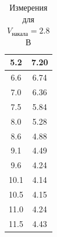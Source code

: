\documentclass[12pt]{article}
\begin{document}
\begin{table}[h!]
{\begin{tabular}{|c|c|}
\hline
5.2	&7.20 \\
\hline
6.6	&6.74 \\
\hline
7.0&	6.36 \\
\hline
7.5	&5.84 \\
\hline
8.0	&5.28 \\
\hline
8.6&	4.88 \\
\hline
9.1&	4.49 \\
\hline
9.6	&4.24 \\
\hline
10.1&	4.14 \\
\hline
10.5&	4.15 \\
\hline
11.0&	4.24 \\
\hline
11.5&	4.43 \\
\hline
\end{tabular}
\caption{Измерения для $V_\text{накала} = 2.8$ В}
}
\end{table}
\par
\end{document}
